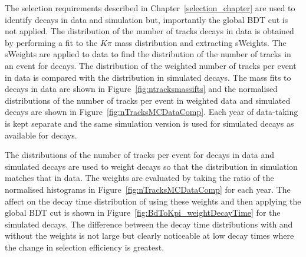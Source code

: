 The selection requirements described in Chapter~\ref{selection_chapter} are used to identify \bdkpi decays in data and simulation but, importantly the global BDT cut is not applied. The distribution of the number of tracks \bdkpi decays in data is obtained by performing a fit to the $K\pi$ mass distribution and extracting sWeights. The sWeights are applied to data to find the distribution of the number of tracks in an event for \bdkpi decays. The distribution of the weighted number of tracks per event in data is compared with the distribution in simulated \bdkpi decays. The mass fits to \bdkpi decays in data are shown in Figure~\ref{fig:ntracksmassifts} and the normalised distributions of the number of tracks per event in weighted data and simulated decays are shown in Figure~\ref{fig:nTracksMCDataComp}. Each year of data-taking is kept separate and the same simulation version is used for \bdkpi simulated decays as available for \bsmumu decays.


The distributions of the number of tracks per event for \bdkpi decays in data and simulated decays are used to weight \bdkpi decays so that the distribution in simulation matches that in data. The weights are evaluated by taking the ratio of the normalised histograms in Figure~\ref{fig:nTracksMCDataComp} for each year. The affect on the decay time distribution of using these weights and then applying the global BDT cut is shown in Figure~\ref{fig:BdToKpi_weightDecayTime} for the simulated \bdkpi decays. The difference between the decay time distributions with and without the weights is not large but clearly noticeable at low decay times where the change in selection efficiency is greatest.


